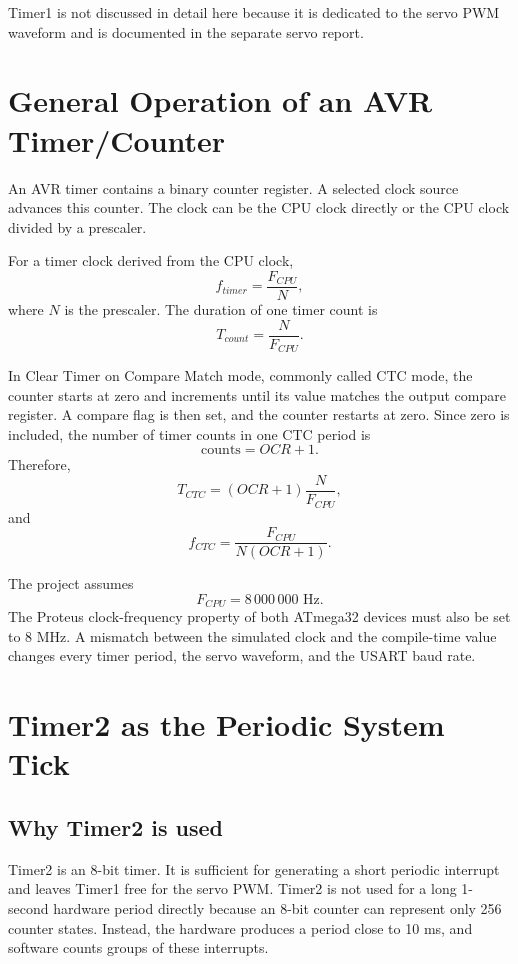 \documentclass[11pt,a4paper]{article}
\begin{document}
Timer1 is not discussed in detail here because it is dedicated to the servo PWM waveform and is documented in the separate servo report.

\section{General Operation of an AVR Timer/Counter}
An AVR timer contains a binary counter register. A selected clock source advances this counter. The clock can be the CPU clock directly or the CPU clock divided by a prescaler.

For a timer clock derived from the CPU clock,
\[
f_{timer}=\frac{F_{CPU}}{N},
\]
where \(N\) is the prescaler. The duration of one timer count is
\[
T_{count}=\frac{N}{F_{CPU}}.
\]

In Clear Timer on Compare Match mode, commonly called CTC mode, the counter starts at zero and increments until its value matches the output compare register. A compare flag is then set, and the counter restarts at zero. Since zero is included, the number of timer counts in one CTC period is
\[
\text{counts}=OCR+1.
\]
Therefore,
\[
T_{CTC}=(OCR+1)\frac{N}{F_{CPU}},
\]
and
\[
f_{CTC}=\frac{F_{CPU}}{N(OCR+1)}.
\]

The project assumes
\[
F_{CPU}=8\,000\,000\text{ Hz}.
\]
The Proteus clock-frequency property of both ATmega32 devices must also be set to 8 MHz. A mismatch between the simulated clock and the compile-time value changes every timer period, the servo waveform, and the USART baud rate.

\section{Timer2 as the Periodic System Tick}
\subsection{Why Timer2 is used}
Timer2 is an 8-bit timer. It is sufficient for generating a short periodic interrupt and leaves Timer1 free for the servo PWM. Timer2 is not used for a long 1-second hardware period directly because an 8-bit counter can represent only 256 counter states. Instead, the hardware produces a period close to 10 ms, and software counts groups of these interrupts.
\end{document}
